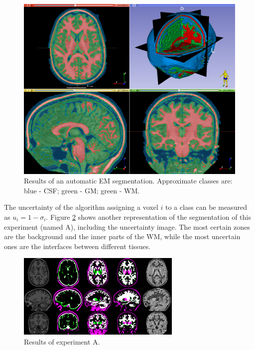 \begin{figure}
  \centering
  \includegraphics[width=\textwidth]{figures/em_first}
  \caption{Results of an automatic EM segmentation. Approximate classes are: blue - CSF; green - GM; green - WM.}
  \label{fig:em-first}
\end{figure}

The uncertainty of the algorithm assigning a voxel $i$ to a class can be measured as $u_i = 1 - \sigma_i$. Figure \ref{fig:experiment-a} shows another representation of the segmentation of this experiment (named A), including the uncertainty image. The most certain zones are the background and the inner parts of the WM, while the most uncertain ones are the interfaces between different tissues.


\begin{figure}
  \centering
  \includegraphics[width=0.7\textwidth]{figures/experiment_a}
  \caption{Results of experiment A.}
  \label{fig:experiment-a}
\end{figure}




